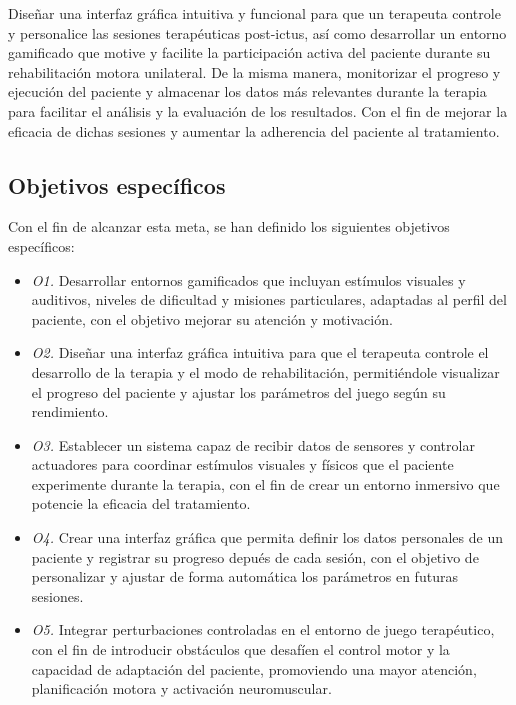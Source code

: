 Diseñar una interfaz gráfica intuitiva y funcional para que un terapeuta controle y personalice las sesiones terapéuticas post-ictus, así como desarrollar un entorno gamificado que motive y facilite la participación activa del paciente durante su rehabilitación motora unilateral.
De la misma manera, monitorizar el progreso y ejecución del paciente y almacenar los datos más relevantes durante la terapia para facilitar el análisis y la evaluación de los resultados.
Con el fin de mejorar la eficacia de dichas sesiones y aumentar la adherencia del paciente al tratamiento.

\subsection{Objetivos específicos}
\label{sec:descripcion}

Con el fin de alcanzar esta meta, se han definido los siguientes objetivos específicos:

\begin{itemize}
    \item \textit{O1.} Desarrollar entornos gamificados que incluyan estímulos visuales y auditivos, niveles de dificultad y misiones particulares, adaptadas al perfil del paciente, con el objetivo mejorar su atención y motivación.
    \item \textit{O2.} Diseñar una interfaz gráfica intuitiva para que el terapeuta controle el desarrollo de la terapia y el modo de rehabilitación, permitiéndole visualizar el progreso del paciente y ajustar los parámetros del juego según su rendimiento.
    \item \textit{O3.} Establecer un sistema capaz de recibir datos de sensores y controlar actuadores para coordinar estímulos visuales y físicos que el paciente experimente durante la terapia, con el fin de crear un entorno inmersivo que potencie la eficacia del tratamiento.
    \item \textit{O4.} Crear una interfaz gráfica que permita definir los datos personales de un paciente y registrar su progreso depués de cada sesión, con el objetivo de personalizar y ajustar de forma automática los parámetros en futuras sesiones.
    \item \textit{O5.} Integrar perturbaciones controladas en el entorno de juego terapéutico, con el fin de introducir obstáculos que desafíen el control motor y la capacidad de adaptación del paciente, promoviendo una mayor atención, planificación motora y activación neuromuscular.
\end{itemize}\

